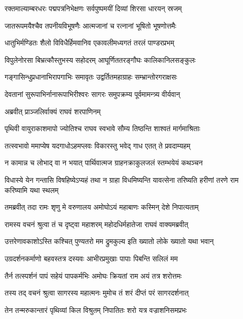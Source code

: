 \twolineshloka
{रक्तमाल्याम्बरधरः पद्मपत्रनिभेक्षणः}
{सर्वपुष्पमयीं दिव्यां शिरसा धारयन् स्रजम्} %

\twolineshloka
{जातरूपमयैश्चैव तपनीयविभूषणैः}
{आत्मजानां च रत्नानां भूषितो भूषणोत्तमैः} %

\twolineshloka
{धातुभिर्मण्डितः शैलो विविधैर्हिमवानिव}
{एकावलीमध्यगतं तरलं पाण्डरप्रभम्} %

\twolineshloka
{विपुलेनोरसा बिभ्रत्कौस्तुभस्य सहोदरम्}
{आघूर्णिततरङ्गौघः कालिकानिलसङ्कुलः} %

\twolineshloka
{गङ्गासिन्धुप्रधानाभिरापगाभिः समावृतः}
{उद्वर्तितमहाग्राहः सम्भ्रान्तोरगराक्षसः} %

\twolineshloka
{देवतानां सुरूपाभिर्नानारूपाभिरीश्वरः}
{सागरः समुपक्रम्य पूर्वमामन्त्र्य वीर्यवान्} %

\onelineshloka
{अब्रवीत् प्राञ्जलिर्वाक्यं राघवं शरपाणिनम्} %

\twolineshloka
{पृथिवी वायुराकाशमापो ज्योतिश्च राघव}
{स्वभावे सौम्य तिष्ठन्ति शाश्वतं मार्गमाश्रिताः} %

\twolineshloka
{तत्स्वभावो ममाप्येष यदगाधोऽहमप्लवः}
{विकारस्तु भवेद् गाध एतत् ते प्रवदाम्यहम्} %

\twolineshloka
{न कामान्न च लोभाद् वा न भयात् पार्थिवात्मज}
{ग्राहनक्राकुलजलं स्तम्भयेयं कथञ्चन} %

\threelineshloka
{विधास्ये येन गन्तासि विषहिष्येऽप्यहं तथा}
{न ग्राहा विधमिष्यन्ति यावत्सेना तरिष्यति}
{हरीणां तरणे राम करिष्यामि यथा स्थलम्} %

\twolineshloka
{तमब्रवीत् तदा रामः शृणु मे वरुणालय}
{अमोघोऽयं महाबाणः कस्मिन् देशे निपात्यताम्} %

\twolineshloka
{रामस्य वचनं श्रुत्वा तं च दृष्ट्वा महाशरम्}
{महोदधिर्महातेजा राघवं वाक्यमब्रवीत्} %

\twolineshloka
{उत्तरेणावकाशोऽस्ति कश्चित् पुण्यतरो मम}
{द्रुमकुल्य इति ख्यातो लोके ख्यातो यथा भवान्} %

\twolineshloka
{उग्रदर्शनकर्माणो बहवस्तत्र दस्यवः}
{आभीरप्रमुखाः पापाः पिबन्ति सलिलं मम} %

\twolineshloka
{तैर्न तत्स्पर्शनं पापं सहेयं पापकर्मभिः}
{अमोघः क्रियतां राम अयं तत्र शरोत्तमः} %

\twolineshloka
{तस्य तद् वचनं श्रुत्वा सागरस्य महात्मनः}
{मुमोच तं शरं दीप्तं परं सागरदर्शनात्} %

\twolineshloka
{तेन तन्मरुकान्तारं पृथिव्यां किल विश्रुतम्}
{निपातितः शरो यत्र वज्राशनिसमप्रभः} %

